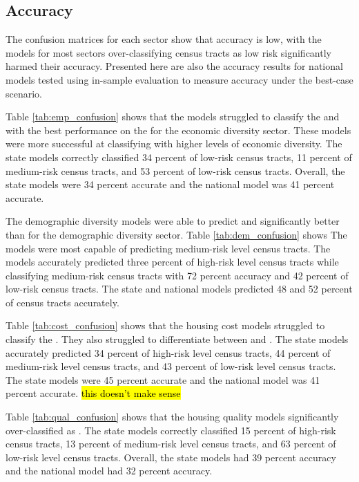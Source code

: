 \subsection{Accuracy}
The confusion matrices for each sector show that accuracy is low, with the models for most sectors over-classifying census tracts as low risk significantly harmed their accuracy. Presented here are also the accuracy results for national models tested using in-sample evaluation to measure accuracy under the best-case scenario. 

Table \ref{tab:emp_confusion} shows that the models struggled to classify the \mrls and \hrls with the best performance on the \lrls for the economic diversity sector. These models were more successful at classifying \cts with higher levels of economic diversity. The state models correctly classified 34 percent of low-risk census tracts, 11 percent of medium-risk census tracts, and 53 percent of low-risk census tracts. Overall, the state models were 34 percent accurate and the national model was 41 percent accurate. 

 


The demographic diversity models were able to predict \mrls and \lrls significantly better than \hrls for the demographic diversity sector.  Table \ref{tab:dem_confusion} shows The models were most capable of predicting medium-risk level census tracts. The models accurately predicted three percent of high-risk level census tracts while classifying medium-risk census tracts with 72 percent accuracy and 42 percent of low-risk census tracts. The state and national models predicted 48 and 52 percent of census tracts accurately. 

 

Table \ref{tab:cost_confusion} shows that the housing cost models struggled to classify the \lrl \cts. They also struggled to differentiate between \mrl and \hrl \cts. The state models accurately predicted 34 percent of high-risk level census tracts, 44 percent of medium-risk level census tracts, and 43 percent of low-risk level census tracts. The state models were 45 percent accurate and the national model was 41 percent accurate. \hl{this doesn't make sense}

 

Table \ref{tab:qual_confusion} shows that the housing quality models significantly over-classified \cts as \lrl. The state models correctly classified 15 percent of high-risk census tracts, 13 percent of medium-risk level census tracts, and 63 percent of low-risk level census tracts. Overall, the state models had 39 percent accuracy and the national model had 32 percent accuracy. 

